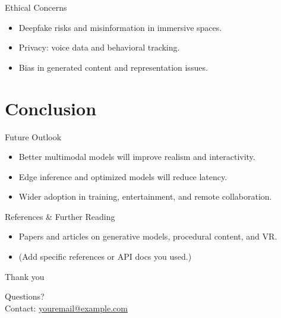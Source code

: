 \documentclass[11pt]{beamer}
\begin{document}
\begin{frame}{Ethical Concerns}
  \begin{itemize}
    \item Deepfake risks and misinformation in immersive spaces.
    \item Privacy: voice data and behavioral tracking.
    \item Bias in generated content and representation issues.
  \end{itemize}
\end{frame}

\section{Conclusion}
\begin{frame}{Future Outlook}
  \begin{itemize}
    \item Better multimodal models will improve realism and interactivity.
    \item Edge inference and optimized models will reduce latency.
    \item Wider adoption in training, entertainment, and remote collaboration.
  \end{itemize}
\end{frame}

\begin{frame}{References \& Further Reading}
  \begin{itemize}
    \item Papers and articles on generative models, procedural content, and VR.
    \item (Add specific references or API docs you used.)
  \end{itemize}
\end{frame}

\begin{frame}{Thank you}
  \begin{center}
    Questions? \\
    \vspace{3mm}
    Contact: \href{mailto:youremail@example.com}{youremail@example.com}
  \end{center}
\end{frame}
\end{document}
